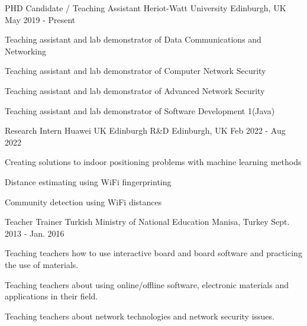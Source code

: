




\begin{cventries}
  \cventry
    {PHD Candidate / Teaching Assistant} %
    {Heriot-Watt University} %
    {Edinburgh, UK} %
    {May 2019 - Present} %
    {
      \begin{cvitems} %
        \item {Teaching assistant and lab demonstrator of Data Communications and Networking}
		\item {Teaching assistant and lab demonstrator of Computer Network Security}
		 \item {Teaching assistant and lab demonstrator of Advanced Network Security}
		\item {Teaching assistant and lab demonstrator of Software Development 1(Java)}
      \end{cvitems}
    }


  \cventry
    {Research Intern} %
    {Huawei UK Edinburgh R\&D} %
    {Edinburgh, UK} %
    {Feb 2022  - Aug 2022 } %
    {
      \begin{cvitems} %
        \item {Creating solutions to indoor positioning problems with machine learning methods}
		\item {Distance estimating using WiFi fingerprinting}
		 \item {Community detection using WiFi distances}
      \end{cvitems}
    }
  \cventry
    {Teacher Trainer} %
    {Turkish Ministry of National Education} %
    {Manisa, Turkey} %
    {Sept. 2013 - Jan. 2016} %
    {
      \begin{cvitems} %
               \item {Teaching teachers how to use interactive board and board software and practicing the use of materials.}
\item {Teaching teachers about using online/offline software, electronic materials and applications in their field.}
\item {Teaching teachers about network technologies and network security issues.}
      \end{cvitems}
    }






\end{cventries}
